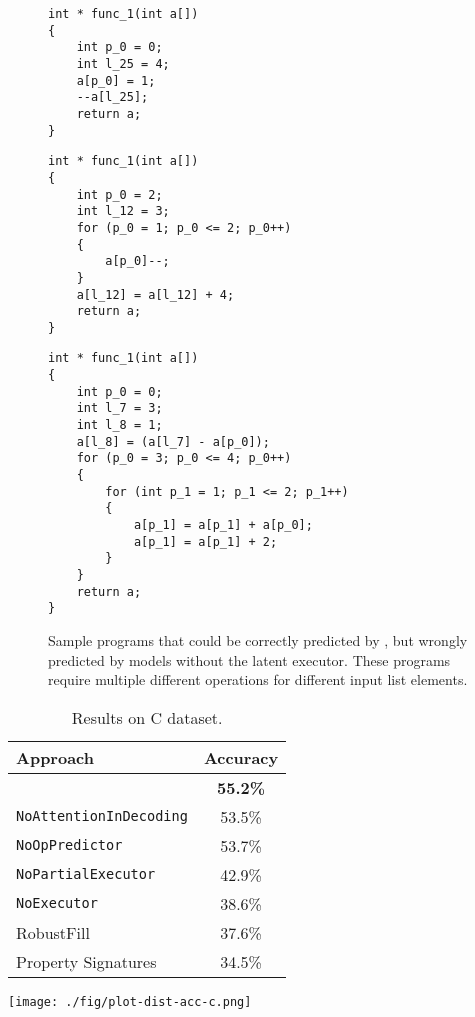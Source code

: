 \begin{figure}
\begin{minipage}{0.25\textwidth}
\begin{verbatim}
int * func_1(int a[])
{
    int p_0 = 0;
    int l_25 = 4;
    a[p_0] = 1;
    --a[l_25];
    return a;
}
\end{verbatim}
\end{minipage}
\begin{minipage}{0.33\textwidth}
\begin{verbatim}
int * func_1(int a[])
{
    int p_0 = 2;
    int l_12 = 3;
    for (p_0 = 1; p_0 <= 2; p_0++)
    {
        a[p_0]--;
    }
    a[l_12] = a[l_12] + 4;
    return a;
}
\end{verbatim}
\end{minipage}
\begin{minipage}{0.2\textwidth}
\begin{verbatim}
int * func_1(int a[])
{
    int p_0 = 0;
    int l_7 = 3;
    int l_8 = 1;
    a[l_8] = (a[l_7] - a[p_0]);
    for (p_0 = 3; p_0 <= 4; p_0++)
    {
        for (int p_1 = 1; p_1 <= 2; p_1++)
        {
            a[p_1] = a[p_1] + a[p_0];
            a[p_1] = a[p_1] + 2;
        }
    }
    return a;
}
\end{verbatim}
\end{minipage}
\caption{\small Sample programs that could be correctly predicted by {\ours}, but wrongly predicted by models without the latent executor. These programs require multiple different operations for different input list elements. }
\label{fig:ex-c-exec}
\vspace{-0.15in}
\end{figure}

\begin{table}[t]
\begin{minipage}{0.5\linewidth}
\caption{\small Results on C dataset.}
\label{tab:c}
\centering
\begin{tabular}{lc}
\toprule
\textbf{Approach}  & Accuracy \\
\midrule
\ours{} & \textbf{55.2\%} \\
\texttt{NoAttentionInDecoding} & 53.5\% \\
\texttt{NoOpPredictor} & 53.7\% \\
\texttt{NoPartialExecutor} &  42.9\% \\
\texttt{NoExecutor} &  38.6\% \\
RobustFill~\cite{devlin2017robustfill} & 37.6\% \\
Property Signatures~\cite{odena2020learning} & 34.5\% \\
\bottomrule
\end{tabular}
\end{minipage}
\begin{minipage}{0.45\linewidth}
    \texttt{[image: ./fig/plot-dist-acc-c.png]}
    \label{fig:c-acc-dist}
\end{minipage}
\end{table}
    
